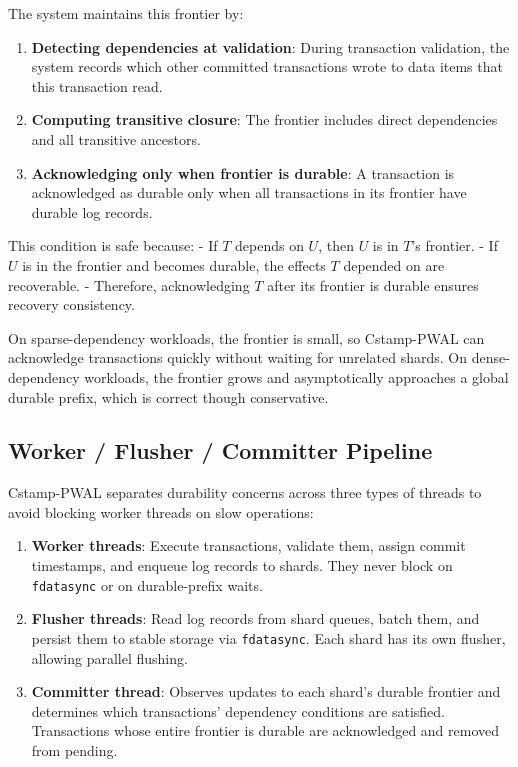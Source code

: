 The system maintains this frontier by:

\begin{enumerate}

\item \textbf{Detecting dependencies at validation}: During transaction
validation, the system records which other committed transactions wrote to data
items that this transaction read.

\item \textbf{Computing transitive closure}: The frontier includes direct
dependencies and all transitive ancestors.

\item \textbf{Acknowledging only when frontier is durable}: A transaction is
acknowledged as durable only when all transactions in its frontier have durable
log records.

\end{enumerate}

This condition is safe because:
- If $T$ depends on $U$, then $U$ is in $T$'s frontier.
- If $U$ is in the frontier and becomes durable, the effects $T$ depended on are
  recoverable.
- Therefore, acknowledging $T$ after its frontier is durable ensures recovery
  consistency.

On sparse-dependency workloads, the frontier is small, so Cstamp-PWAL can
acknowledge transactions quickly without waiting for unrelated shards.  On dense-
dependency workloads, the frontier grows and asymptotically approaches a global
durable prefix, which is correct though conservative.

\subsection{Worker / Flusher / Committer Pipeline}

Cstamp-PWAL separates durability concerns across three types of threads to
avoid blocking worker threads on slow operations:

\begin{enumerate}

\item \textbf{Worker threads}: Execute transactions, validate them, assign commit
timestamps, and enqueue log records to shards.  They never block on
\texttt{fdatasync} or on durable-prefix waits.

\item \textbf{Flusher threads}: Read log records from shard queues, batch them,
and persist them to stable storage via \texttt{fdatasync}.  Each shard has its
own flusher, allowing parallel flushing.

\item \textbf{Committer thread}: Observes updates to each shard's durable frontier
and determines which transactions' dependency conditions are satisfied.
Transactions whose entire frontier is durable are acknowledged and removed from
pending.

\end{enumerate}

